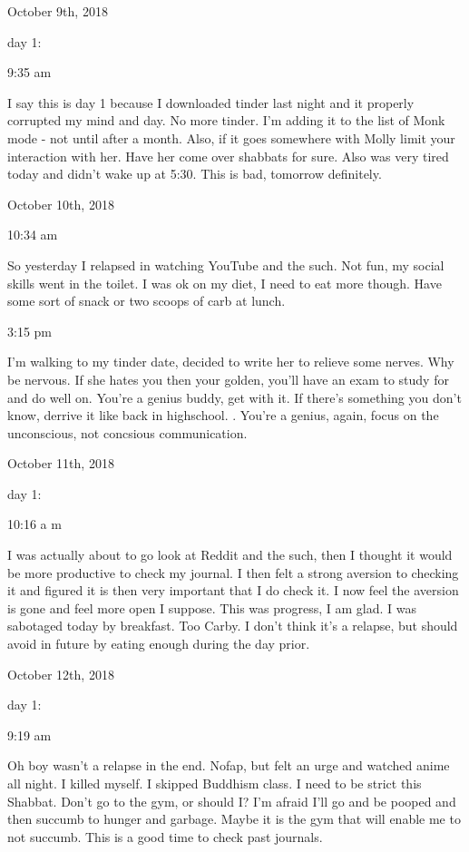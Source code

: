 \bigskip
\bigskip
October 9th, 2018

day 1:

9:35 am

I say this is day 1 because I downloaded tinder last night and it
properly corrupted my mind and day. No more tinder. I'm adding it to the
list of Monk mode - not until after a month. Also, if it goes somewhere
with Molly limit your interaction with her. Have her come over shabbats
for sure. Also was very tired today and didn't wake up at 5:30. This is
bad, tomorrow definitely.

\bigskip
\bigskip
October 10th, 2018

10:34 am

So yesterday I relapsed in watching YouTube and the such. Not fun, my
social skills went in the toilet. I was ok on my diet, I need to eat
more though. Have some sort of snack or two scoops of carb at lunch.

3:15 pm

I'm walking to my tinder date, decided to write her to relieve some
nerves. Why be nervous. If she hates you then your golden, you'll have
an exam to study for and do well on. You're a genius buddy, get with it.
If there's something you don't know, derrive it like back in highschool.
. You're a genius, again, focus on the unconscious, not concsious
communication.

\bigskip
\bigskip
October 11th, 2018

day 1:

10:16 a m

I was actually about to go look at Reddit and the such, then I thought
it would be more productive to check my journal. I then felt a strong
aversion to checking it and figured it is then very important that I do
check it. I now feel the aversion is gone and feel more open I suppose.
This was progress, I am glad. I was sabotaged today by breakfast. Too
Carby. I don't think it's a relapse, but should avoid in future by
eating enough during the day prior.

\bigskip
\bigskip
October 12th, 2018

day 1:

9:19 am

Oh boy wasn't a relapse in the end. Nofap, but felt an urge and watched
anime all night. I killed myself. I skipped Buddhism class. I need to be
strict this Shabbat. Don't go to the gym, or should I? I'm afraid I'll
go and be pooped and then succumb to hunger and garbage. Maybe it is the
gym that will enable me to not succumb. This is a good time to check
past journals.

